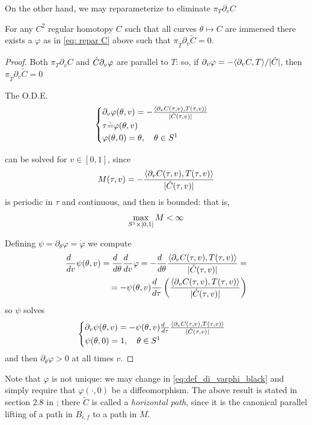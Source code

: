 \documentclass[twoside,a4paper,english]{article}
\def\derpar#1{\partial_{#1}}
\begin{document}
On the other hand, we may reparameterize to eliminate $\pi_T\derpar v C$
\begin{Proposition}\label{prop: black magic}
  For any $C^2$ regular homotopy $C$ such that all curves $\theta\mapsto C$
  are immersed
  there exists a $\varphi$ as in \eqref{eq: repar C} above 
  such that $\pi_{\widetilde T}\derpar v \widetilde C=0$.

  \begin{proof}
    Both  $\pi_T\derpar v   C$ and 
    $\overdot C\derpar v\varphi$ are parallel to $T$:
    so, if $\derpar v\varphi= 
      -{\langle\derpar v C, T\rangle}/
      {|\overdot C|}$, then 
      $\pi_{\widetilde T}\derpar v \widetilde C=0$
      
    The O.D.E.     
    \begin{equation}
      \begin{cases}
      \derpar v\varphi(\theta,v)= 
      -\frac{\langle\derpar v C(\tau,v), T(\tau,v)\rangle}
      {|\overdot C(\tau,v)|}
      \\
      \tau\defeq\varphi(\theta,v) \cr
      \varphi(\theta,0)=\theta, ~~~\theta\in S^1
    \end{cases}
    \label{eq:def_di_varphi_black}
  \end{equation}
    
    can be solved for $v\in[0,1]$, since 
    $$M(\tau,v)=-\frac{\langle\derpar v C(\tau,v), T(\tau,v)\rangle}
    {|\overdot C(\tau,v)|}$$
    is periodic in $\tau$ and continuous, and then is bounded: that is, 
    \[\max_{S^1\times[0,1]} M < \infty\]
    

    Defining $\psi=\derpar \theta \varphi=\dot \varphi$  we compute
    \begin{eqnarray*}
      \der v\psi(\theta,v)= 
      \der \theta \der v \varphi=
      -\der \theta\frac{\langle\derpar v C(\tau,v) ,
      T(\tau,v)\rangle}{|\overdot C(\tau,v)|}
      =\\=
      -\psi(\theta,v)\der \tau\left(\frac{\langle\derpar v C(\tau,v) ,
      T(\tau,v)\rangle}{|\overdot C(\tau,v)|}\right)
    \end{eqnarray*}
    so $\psi$ solves
    \begin{equation}
      \label{eq: ode psi}
      \begin{cases}
        \derpar v\psi(\theta,v)= 
      -\psi(\theta,v)\der \tau\frac{\langle\derpar v C(\tau,v) ,
        T(\tau,v)\rangle}{|\overdot C(\tau,v)|}
        \\
        \psi(\theta,0)=1, ~~~\theta\in S^1
      \end{cases}
    \end{equation}
    and then $\derpar \theta \varphi>0$ at all times $v$.
  \end{proof}
\end{Proposition}
Note that $\varphi$ is not unique: we may change in 
\eqref{eq:def_di_varphi_black} and simply require that 
$\varphi(\cdot,0)$ be a diffeomorphism. \quad
The above result is stated in section 2.8 in \cite{Michor-Mumford}; there 
$\widetilde C$ is called a \emph{horizontal path}, since it
is the canonical parallel lifting of a path in $B_{i,f}$ to a path in $M$.
\end{document}
